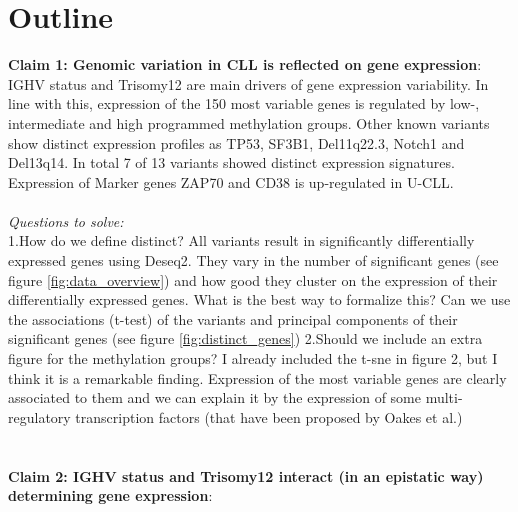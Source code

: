 \documentclass[a4paper,fontsize=12pt,headsepline]{scrartcl}
\begin{document}
	
	\setcounter{page}{0}
	\cleardoublepage
	
	\onehalfspacing	


\section*{Outline} 

\textbf{Claim 1: Genomic variation in CLL is reflected on gene expression}: \\
    IGHV status and Trisomy12 are main drivers of gene expression variability. In line with this, expression of the 150 most variable genes is regulated by low-, intermediate and high programmed methylation groups. Other known variants show distinct expression profiles as TP53, SF3B1, Del11q22.3, Notch1 and Del13q14. In total 7 of 13 variants showed distinct expression  signatures. Expression of Marker genes ZAP70 and CD38 is up-regulated in U-CLL.\\
    \\
    \textit{Questions to solve:}\\
    1.How do we define distinct? All variants result in significantly differentially expressed genes using Deseq2. They vary in the number of significant genes (see figure \ref {fig:data_overview}) and how good they cluster on the expression of their differentially expressed genes. What is the best way to formalize this? Can we use the associations (t-test) of the variants and principal components of their significant genes (see figure \ref {fig:distinct_genes})
    2.Should we include an extra figure for the methylation groups? I already included the t-sne in figure 2, but I think it is a remarkable finding. Expression of the most variable genes are clearly associated to them and we can explain it by the expression of some multi-regulatory transcription factors (that have been proposed by Oakes et al.)
\\
    \\
    \\
\textbf{Claim 2: IGHV status and Trisomy12 interact (in an epistatic way) determining gene expression}: \\
\end{document}
